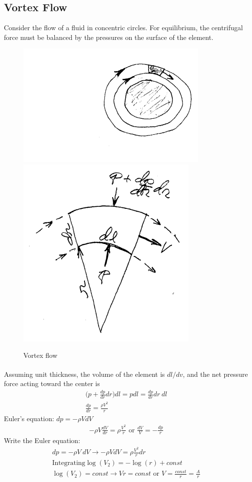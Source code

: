 \documentclass[draft=false, titlepage]{article}
\begin{document}
\subsection{Vortex Flow}
Consider the flow of a fluid in concentric circles. For equilibrium, the centrifugal force must be balanced by the pressures on the surface of the element.
\begin{figure}[ht]
	\centering
	\includegraphics[width=0.3\linewidth]{Figures/p26_vortex1.PNG}
	\includegraphics[width=0.25\linewidth]{Figures/p26_vortex2.PNG}
	\caption{Vortex flow}
	\label{fig:p26_vortex}
\end{figure}

\paragraph*{} Assuming unit thickness, the volume of the element is $dl/dv$, and the net pressure force acting toward the center is 
\begin{gather*}
\Big( p + \frac{dp}{dr}dr \Big) dl = pdl = \frac{dp}{dr}dr\ dl\\
\frac{dp}{dr} = \frac{\rho V^2}{r}
\end{gather*}
Euler's equation: $dp = -\rho V dV$
\begin{gather*}
-\rho V \frac{dV}{dr} = \rho \frac{V^2}{r} \text{ or } \frac{dV}{V} = -\frac{dp}{r}
\end{gather*}
Write the Euler equation:
\begin{gather*}
dp = -\rho V\ dV \rightarrow -\rho V dV = \rho \frac{V^2}{r} dr\\
\text{Integrating} \log(V_2) = -\log(r) + const\\
\log(V_2) = const \rightarrow Vr = const \text{ or } V = \frac{const}{r} = \frac{A}{r}
\end{gather*}
\end{document}
